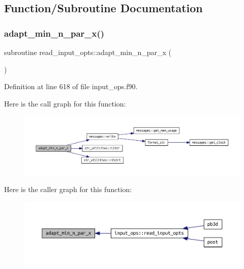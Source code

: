 \subsection{Function/\+Subroutine Documentation}
\mbox{\label{input__ops_8f90_a911791dfa1bc69e9c2e00488d0a5d60b}} 
\subsubsection{\texorpdfstring{adapt\+\_\+min\+\_\+n\+\_\+par\+\_\+x()}{adapt\_min\_n\_par\_x()}}
{\footnotesize\ttfamily subroutine read\+\_\+input\+\_\+opts\+::adapt\+\_\+min\+\_\+n\+\_\+par\+\_\+x (\begin{DoxyParamCaption}{ }\end{DoxyParamCaption})}



Definition at line 618 of file input\+\_\+ops.\+f90.

Here is the call graph for this function\+:
\nopagebreak
\begin{figure}[H]
\begin{center}
\leavevmode
\includegraphics[width=350pt]{input__ops_8f90_a911791dfa1bc69e9c2e00488d0a5d60b_cgraph}
\end{center}
\end{figure}
Here is the caller graph for this function\+:
\nopagebreak
\begin{figure}[H]
\begin{center}
\leavevmode
\includegraphics[width=350pt]{input__ops_8f90_a911791dfa1bc69e9c2e00488d0a5d60b_icgraph}
\end{center}
\end{figure}
\mbox{\label{input__ops_8f90_ab580aa4852afcd4a9de50b1b98de14cb}} 
